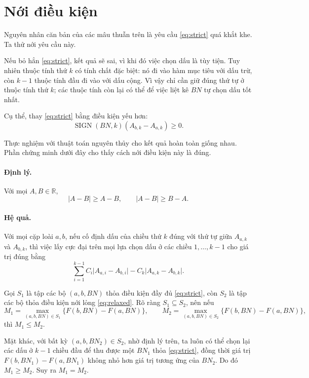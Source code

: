 \documentclass[11pt]{article}
\begin{document}
\section{Nới điều kiện}

Nguyên nhân căn bản của các mâu thuẫn trên là yêu cầu \eqref{eq:strict} quá khắt khe. Ta thử
nới yêu cầu này.

Nếu bỏ hẳn \eqref{eq:strict}, kết quả sẽ sai, vì khi đó việc chọn dấu là tùy tiện. Tuy nhiên
thuộc tính thứ \(k\) có tính chất đặc biệt: nó đi vào hàm mục tiêu với dấu trừ,
còn \(k-1\) thuộc tính đầu đi vào với dấu cộng. Vì vậy chỉ cần giữ đúng thứ tự
ở thuộc tính thứ \(k\); các thuộc tính còn lại có thể để việc liệt kê \(BN\)
tự chọn dấu tốt nhất.

Cụ thể, thay \eqref{eq:strict} bằng điều kiện yếu hơn:
\begin{equation}
  \operatorname{SIGN}(BN,k)(A_{b,k}-A_{a,k})\ge 0.
\label{eq:relaxed}
\end{equation}

Thực nghiệm với thuật toán nguyên thủy cho kết quả hoàn toàn giống nhau. Phần
chứng minh dưới đây cho thấy cách nới điều kiện này là đúng.

\paragraph{Định lý.}
Với mọi \(A,B\in\mathbb{R}\),
\[
  \lvert A-B\rvert\ge A-B,\qquad
  \lvert A-B\rvert\ge B-A.
\]

\paragraph{Hệ quả.}
Với mọi cặp loài \(a,b\), nếu cố định dấu của chiều thứ \(k\) đúng với thứ tự
giữa \(A_{a,k}\) và \(A_{b,k}\), thì việc lấy cực đại trên mọi lựa chọn dấu ở
các chiều \(1,\ldots,k-1\) cho giá trị đúng bằng
\[
  \sum_{i=1}^{k-1} C_i\lvert A_{a,i}-A_{b,i}\rvert
  - C_k\lvert A_{a,k}-A_{b,k}\rvert.
\]

Gọi \(S_1\) là tập các bộ \((a,b,BN)\) thỏa điều kiện đầy đủ \eqref{eq:strict}, còn \(S_2\)
là tập các bộ thỏa điều kiện nới lỏng \eqref{eq:relaxed}. Rõ ràng \(S_1\subseteq S_2\), nên
nếu
\[
  M_1=\max_{(a,b,BN)\in S_1} \{F(b,BN)-F(a,BN)\},\qquad
  M_2=\max_{(a,b,BN)\in S_2} \{F(b,BN)-F(a,BN)\},
\]
thì \(M_1\le M_2\).

Mặt khác, với bất kỳ \((a,b,BN_2)\in S_2\), nhờ định lý trên, ta luôn có thể
chọn lại các dấu ở \(k-1\) chiều đầu để thu được một \(BN_1\) thỏa \eqref{eq:strict}, đồng
thời giá trị \(F(b,BN_1)-F(a,BN_1)\) không nhỏ hơn giá trị tương ứng của
\(BN_2\). Do đó \(M_1\ge M_2\). Suy ra \(M_1=M_2\).
\end{document}

